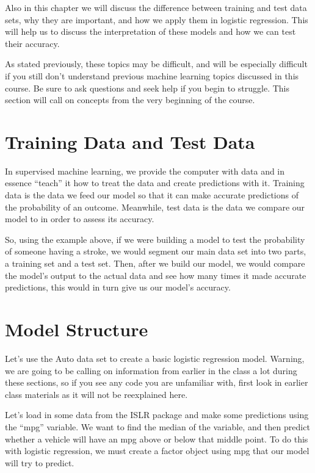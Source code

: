 \documentclass[
]{book}
\begin{document}
Also in this chapter we will discuss the difference between training and test data sets, why they are important, and how we apply them in logistic regression. This will help us to discuss the interpretation of these models and how we can test their accuracy.

As stated previously, these topics may be difficult, and will be especially difficult if you still don't understand previous machine learning topics discussed in this course. Be sure to ask questions and seek help if you begin to struggle. This section will call on concepts from the very beginning of the course.

\hypertarget{training-data-and-test-data}{%
\section{Training Data and Test Data}\label{training-data-and-test-data}}

In supervised machine learning, we provide the computer with data and in essence ``teach'' it how to treat the data and create predictions with it. Training data is the data we feed our model so that it can make accurate predictions of the probability of an outcome. Meanwhile, test data is the data we compare our model to in order to assess its accuracy.

So, using the example above, if we were building a model to test the probability of someone having a stroke, we would segment our main data set into two parts, a training set and a test set. Then, after we build our model, we would compare the model's output to the actual data and see how many times it made accurate predictions, this would in turn give us our model's accuracy.

\hypertarget{model-structure}{%
\section{Model Structure}\label{model-structure}}

Let's use the Auto data set to create a basic logistic regression model. Warning, we are going to be calling on information from earlier in the class a lot during these sections, so if you see any code you are unfamiliar with, first look in earlier class materials as it will not be reexplained here.

Let's load in some data from the ISLR package and make some predictions using the ``mpg'' variable. We want to find the median of the variable, and then predict whether a vehicle will have an mpg above or below that middle point. To do this with logistic regression, we must create a factor object using mpg that our model will try to predict.
\end{document}
